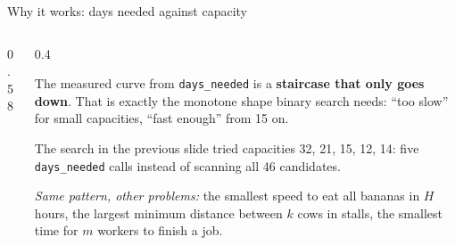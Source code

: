 \documentclass[aspectratio=169,10pt]{beamer}
\begin{document}
\begin{frame}{Why it works: days needed against capacity}
\begin{columns}[T]
\begin{column}{0.58\textwidth}
\begin{sfig}[0.8]
\end{sfig}
\end{column}
\begin{column}{0.4\textwidth}
{\small
The measured curve from \texttt{days\_needed} is a \textbf{staircase that only goes down}. That is exactly the monotone shape binary search needs: ``too slow'' for small capacities, ``fast enough'' from 15 on.

\vspace{2mm}
The search in the previous slide tried capacities 32, 21, 15, 12, 14: five \texttt{days\_needed} calls instead of scanning all 46 candidates.

\vspace{2mm}
\emph{Same pattern, other problems:} the smallest speed to eat all bananas in $H$ hours, the largest minimum distance between $k$ cows in stalls, the smallest time for $m$ workers to finish a job.}
\end{column}
\end{columns}
\end{frame}
\end{document}
